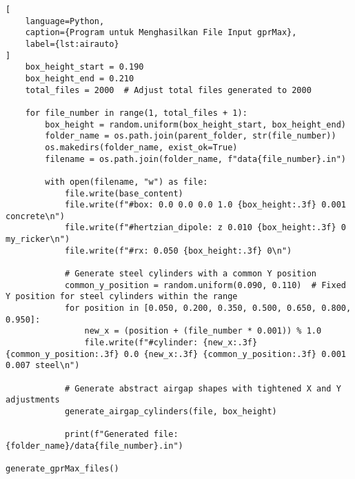 \begin{lstlisting}[
    language=Python,
    caption={Program untuk Menghasilkan File Input gprMax},
    label={lst:airauto}
]
    box_height_start = 0.190
    box_height_end = 0.210
    total_files = 2000  # Adjust total files generated to 2000

    for file_number in range(1, total_files + 1):
        box_height = random.uniform(box_height_start, box_height_end)
        folder_name = os.path.join(parent_folder, str(file_number))
        os.makedirs(folder_name, exist_ok=True)
        filename = os.path.join(folder_name, f"data{file_number}.in")

        with open(filename, "w") as file:
            file.write(base_content)
            file.write(f"#box: 0.0 0.0 0.0 1.0 {box_height:.3f} 0.001 concrete\n")
            file.write(f"#hertzian_dipole: z 0.010 {box_height:.3f} 0 my_ricker\n")
            file.write(f"#rx: 0.050 {box_height:.3f} 0\n")

            # Generate steel cylinders with a common Y position
            common_y_position = random.uniform(0.090, 0.110)  # Fixed Y position for steel cylinders within the range
            for position in [0.050, 0.200, 0.350, 0.500, 0.650, 0.800, 0.950]:
                new_x = (position + (file_number * 0.001)) % 1.0
                file.write(f"#cylinder: {new_x:.3f} {common_y_position:.3f} 0.0 {new_x:.3f} {common_y_position:.3f} 0.001 0.007 steel\n")

            # Generate abstract airgap shapes with tightened X and Y adjustments
            generate_airgap_cylinders(file, box_height)

            print(f"Generated file: {folder_name}/data{file_number}.in")

generate_gprMax_files()

\end{lstlisting}


